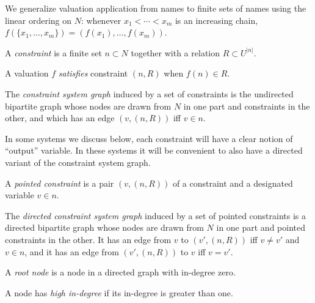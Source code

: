 We generalize valuation application from names to finite sets of names using
the linear ordering on $N$: whenever $x_1 < \cdots < x_m$ is an increasing
chain, $f(\{x_1,\ldots,x_m\}) = (f(x_1),\ldots,f(x_m))$.

\begin{definition}
    A \emph{constraint} is a finite set $n \subset N$ together with a relation $R
    \subset U^{|n|}$.
\end{definition}

\begin{definition}
    A valuation $f$ \emph{satisfies} constraint $(n,R)$ when $f(n) \in R$.
\end{definition}

\begin{definition}
    The \emph{constraint system graph} induced by a set of constraints is
    the undirected bipartite graph whose nodes are drawn from $N$ in one
    part and constraints in the other, and which has an edge $(v,(n,R))$ iff
    $v \in n$.
\end{definition}

In some systems we discuss below, each constraint will have a clear notion
of ``output'' variable. In these systems it will be convenient to also have
a directed variant of the constraint system graph.

\begin{definition}
    A \emph{pointed constraint} is a pair $(v,(n,R))$ of a constraint and a
    designated variable $v\in n$.
\end{definition}

\begin{definition}
    The \emph{directed constraint system graph} induced by a set of pointed
    constraints is a directed bipartite graph whose nodes are drawn from $N$
    in one part and pointed constraints in the other. It has an edge from
    $v$ to $(v',(n,R))$ iff $v \ne v'$ and $v \in n$, and it has an edge
    from $(v',(n,R))$ to $v$ iff $v=v'$.
\end{definition}

\begin{definition}
    A \emph{root node} is a node in a directed graph with in-degree zero.
\end{definition}

\begin{definition}
    A node has \emph{high in-degree} if its in-degree is greater than one.
\end{definition}

